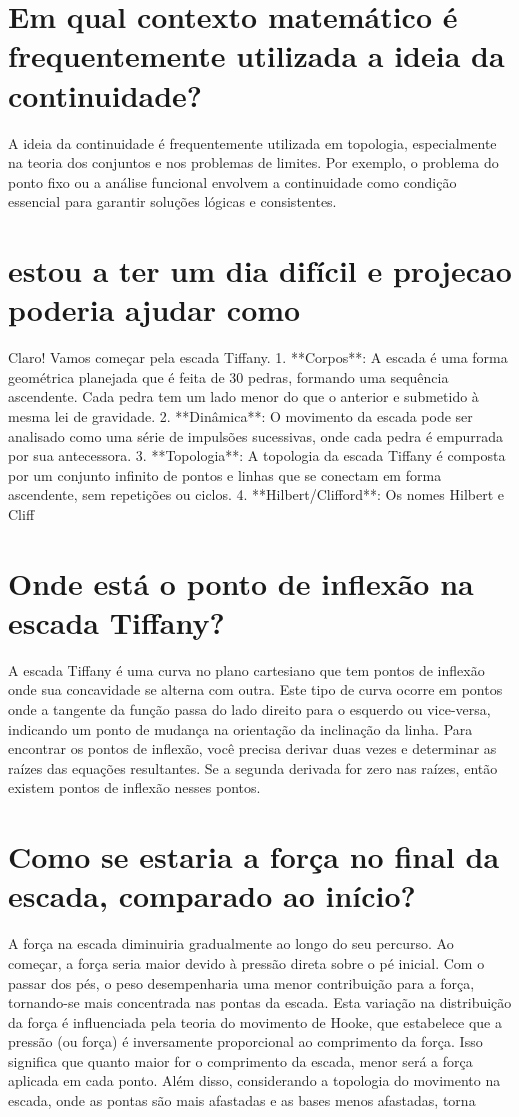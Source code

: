 \documentclass[11pt,a4paper]{article}
\begin{document}
\section{Em qual contexto matemático é frequentemente utilizada a ideia da continuidade?}
A ideia da continuidade é frequentemente utilizada em topologia, especialmente na teoria dos conjuntos e nos problemas de limites. Por exemplo, o problema do ponto fixo ou a análise funcional envolvem a continuidade como condição essencial para garantir soluções lógicas e consistentes.

\section{estou a ter um dia difícil e projecao poderia ajudar como}
Claro! Vamos começar pela escada Tiffany. 1. **Corpos**: A escada é uma forma geométrica planejada que é feita de 30 pedras, formando uma sequência ascendente. Cada pedra tem um lado menor do que o anterior e submetido à mesma lei de gravidade. 2. **Dinâmica**: O movimento da escada pode ser analisado como uma série de impulsões sucessivas, onde cada pedra é empurrada por sua antecessora. 3. **Topologia**: A topologia da escada Tiffany é composta por um conjunto infinito de pontos e linhas que se conectam em forma ascendente, sem repetições ou ciclos. 4. **Hilbert/Clifford**: Os nomes Hilbert e Cliff

\section{Onde está o ponto de inflexão na escada Tiffany?}
A escada Tiffany é uma curva no plano cartesiano que tem pontos de inflexão onde sua concavidade se alterna com outra. Este tipo de curva ocorre em pontos onde a tangente da função passa do lado direito para o esquerdo ou vice-versa, indicando um ponto de mudança na orientação da inclinação da linha. Para encontrar os pontos de inflexão, você precisa derivar duas vezes e determinar as raízes das equações resultantes. Se a segunda derivada for zero nas raízes, então existem pontos de inflexão nesses pontos.

\section{Como se estaria a força no final da escada, comparado ao início?}
A força na escada diminuiria gradualmente ao longo do seu percurso. Ao começar, a força seria maior devido à pressão direta sobre o pé inicial. Com o passar dos pés, o peso desempenharia uma menor contribuição para a força, tornando-se mais concentrada nas pontas da escada. Esta variação na distribuição da força é influenciada pela teoria do movimento de Hooke, que estabelece que a pressão (ou força) é inversamente proporcional ao comprimento da força. Isso significa que quanto maior for o comprimento da escada, menor será a força aplicada em cada ponto. Além disso, considerando a topologia do movimento na escada, onde as pontas são mais afastadas e as bases menos afastadas, torna
\end{document}
